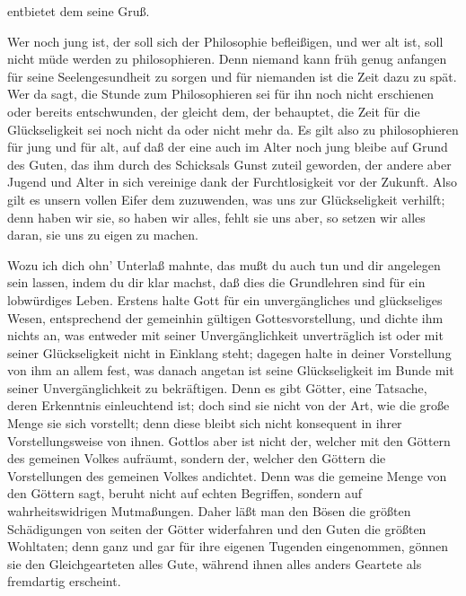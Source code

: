 \documentclass{stex}
\begin{document}


\noindent {} entbietet dem  seine Gruß.

\vspace{1em}
Wer noch jung ist, der soll sich der Philosophie befleißigen, und wer alt ist, soll nicht müde werden zu philosophieren.
Denn niemand kann früh genug anfangen für seine Seelengesundheit zu sorgen und für niemanden ist die Zeit dazu zu spät.
Wer da sagt, die Stunde zum Philosophieren sei für ihn noch nicht erschienen oder bereits entschwunden, der gleicht dem, der behauptet, die Zeit für die Glückseligkeit sei noch nicht da oder nicht mehr da.
Es gilt also zu philosophieren für jung und für alt, auf daß der eine auch im Alter noch jung bleibe auf Grund des Guten, das ihm durch des Schicksals Gunst zuteil geworden, der andere aber Jugend und Alter in sich vereinige dank der Furchtlosigkeit vor der Zukunft.
Also gilt es unsern vollen Eifer dem zuzuwenden, was uns zur Glückseligkeit verhilft; denn haben wir sie, so haben wir alles, fehlt sie uns aber, so setzen wir alles daran, sie uns zu eigen zu machen.

Wozu ich dich ohn’ Unterlaß mahnte, das mußt du auch tun und dir angelegen sein lassen, indem du dir klar machst, daß dies die Grundlehren sind für ein lobwürdiges Leben.
Erstens halte Gott für ein unvergängliches und glückseliges Wesen, entsprechend der gemeinhin gültigen Gottesvorstellung, und dichte ihm nichts an, was entweder mit seiner Unvergänglichkeit unverträglich ist oder mit seiner Glückseligkeit nicht in Einklang steht; dagegen halte in deiner Vorstellung von ihm an allem fest, was danach angetan ist seine Glückseligkeit im Bunde mit seiner Unvergänglichkeit zu bekräftigen.
Denn es gibt Götter, eine Tatsache, deren Erkenntnis einleuchtend ist; doch sind sie nicht von der Art, wie die große Menge sie sich vorstellt; denn diese bleibt sich nicht konsequent in ihrer Vorstellungsweise von ihnen.
Gottlos aber ist nicht der, welcher mit den Göttern des gemeinen Volkes aufräumt, sondern der, welcher den Göttern die Vorstellungen des gemeinen Volkes andichtet.
Denn was die gemeine Menge von den Göttern sagt, beruht nicht auf echten Begriffen, sondern auf wahrheitswidrigen Mutmaßungen.
Daher läßt man den Bösen die größten Schädigungen von seiten der Götter widerfahren und den Guten die größten Wohltaten; denn ganz und gar für ihre eigenen Tugenden eingenommen, gönnen sie den Gleichgearteten alles Gute, während ihnen alles anders Geartete als fremdartig erscheint.
\end{document}
